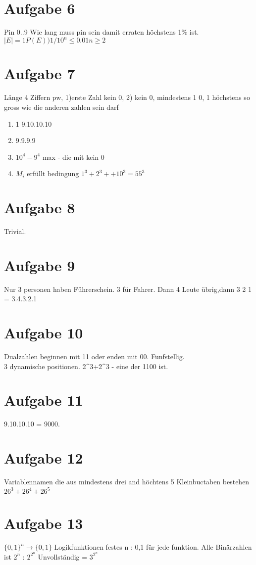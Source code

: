 \documentclass[a4paper,10pt]{scrbook}
\begin{document}
\section*{Aufgabe 6}
Pin 0..9 Wie lang muss pin sein damit erraten höchstens 1\% ist. \\
$|E| = 1 P(E) ) 1/10^n \leq 0.01 n \ge 2$
\section*{Aufgabe 7}
Länge 4 Ziffern pw, 1)erste Zahl kein 0, 2) kein 0, mindestens 1 0, 1 höchstens so gross wie die anderen zahlen sein 
darf

\begin{enumerate}
 \item 1 9.10.10.10
 \item 9.9.9.9
 \item $10^4-9^4$ max - die mit kein 0
 \item $M_i$ erfüllt bedingung $1^3 + 2^3 + + 10^3 = 55^3$
\end{enumerate}

\section*{Aufgabe 8} Trivial.
\section*{Aufgabe 9} Nur 3 personen haben Führerschein. 3 für Fahrer. Dann 4 Leute übrig,dann 3 2 1 = 3.4.3.2.1
\section*{Aufgabe 10} Dualzahlen beginnen mit 11 oder enden mit 00. Funfstellig.\\
3 dynamische positionen. 2^3+2^3 - eine der 1100 ist.
\section*{Aufgabe 11} 9.10.10.10 = 9000.
\section*{Aufgabe 12} Variablennamen die aus mindestens drei and höchtens 5 Kleinbuctaben bestehen
$26^3+26^4+26^5$ 
\section*{Aufgabe 13} $\{0,1\}^n \rightarrow \{0,1\}$ Logikfunktionen festes n : 0,1 für jede funktion. Alle 
Binärzahlen ist $2^n$ : $2^{2^n}$ Unvollständig = $3^{2^n}$
\end{document}
